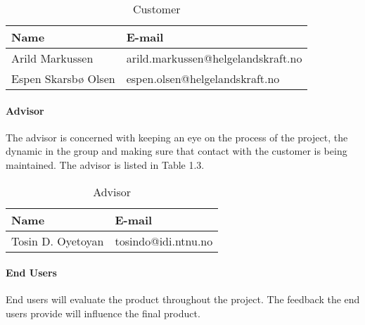 \begin{table}[H]

\begin{center}
    \begin{tabular}{| l | l |}
   	\hline
    \rowcolor{gray}
    {\bf Name} & {\bf E-mail} \\ \hline
    Arild Markussen & arild.markussen@helgelandskraft.no \\ \hline
    Espen Skarsbø Olsen & espen.olsen@helgelandskraft.no \\
    \hline
    \end{tabular}
\end{center}

\caption{Customer}
\end{table}

\paragraph{Advisor}

The advisor is concerned with keeping an eye on the process of the project, the dynamic in the group and making sure that contact with the customer is being maintained. The advisor is listed in Table 1.3.

\begin{table}[H]

\begin{center}
    \begin{tabular}{| l | l |}
    \hline
    \rowcolor{gray}
    {\bf Name} & {\bf E-mail} \\ \hline
    Tosin D. Oyetoyan & tosindo@idi.ntnu.no \\
    \hline
    \end{tabular}
\end{center}

\caption{Advisor}
\end{table}

\paragraph{End Users}

End users will evaluate the product throughout the project. The feedback the end users provide will influence the final product.


